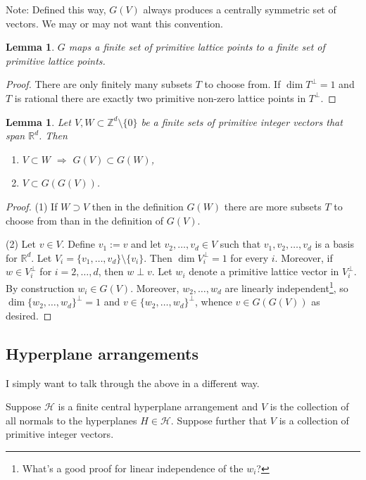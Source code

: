 \documentclass[11pt,letter]{amsart}
\newtheorem{lemma}[definition]{Lemma}
\newcommand{\rAr}{\Rightarrow}
\newcommand{\RR}{\mathbb{R}}
\newcommand{\ZZ}{\mathbb{Z}}
\renewcommand{\dim}{\mathsf{dim}\ }
\renewcommand{\dim}{\operatorname{dim}}
\begin{document}
Note: Defined this way, $G(V)$ always produces a centrally symmetric set of vectors. We may or may not want this convention.

\begin{lemma}
$G$ maps a finite set of primitive lattice points to a finite set of primitive lattice points.
\end{lemma}

\begin{proof}
There are only finitely many subsets $T$ to choose from. If $\dim T^\perp = 1$ and $T$ is rational there are exactly two primitive non-zero lattice points in  $T^\perp$.
\end{proof}

\begin{lemma}
Let $V,W\subset \ZZ^d\setminus\{0\}$ be a finite sets of primitive integer vectors that span $\RR^d$. Then 
\begin{enumerate}
\item $V\subset W$ $\rAr$ $G(V)\subset G(W)$,
\item $V \subset G(G(V))$.
\end{enumerate}
\end{lemma}

\begin{proof}
(1) If $W\supset V$ then in the definition $G(W)$ there are more subsets $T$ to choose from than in the definition of $G(V)$.

(2) Let $v\in V$. Define $v_1:=v$ and let $v_2,\ldots,v_d\in V$ such that $v_1,v_2,\ldots,v_d$ is a basis for $\RR^d$. Let $V_i=\{v_1,\ldots,v_d\}\setminus\{v_i\}$. Then $\dim V_i^\perp = 1$ for every $i$. Moreover, if $w\in V_i^\perp$ for $i=2,\ldots,d$, then $w\perp v$. Let $w_i$ denote a primitive lattice vector in $V_i^\perp$. By construction $w_i\in G(V)$. Moreover, $w_2,\ldots,w_d$ are linearly independent\footnote{What's a good proof for linear independence of the $w_i$?}, so $\dim \{w_2,\ldots,w_d\}^\perp=1$ and $v\in \{w_2,\ldots,w_d\}^\perp$, whence $v\in G(G(V))$ as desired.  
\end{proof}


\subsection{Hyperplane arrangements}

I simply want to talk through the above in a different way.  

Suppose $\mathcal{H}$ is a finite central hyperplane arrangement and $V$ is
the collection of all normals to the hyperplanes $H \in \mathcal{H}$.
Suppose further that $V$ is a collection of primitive integer vectors.
\end{document}
